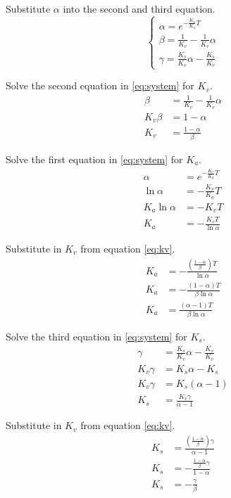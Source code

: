 \documentclass[10pt,conference,compsoc]{IEEEtran}
\begin{document}
Substitute $\alpha$ into the second and third equation.
\begin{equation}
  \begin{cases}
    \alpha = e^{-\frac{K_v}{K_a} T} \\
    \beta = \frac{1}{K_v} - \frac{1}{K_v}\alpha \\
    \gamma = \frac{K_s}{K_v}\alpha - \frac{K_s}{K_v}
  \end{cases} \label{eq:system}
\end{equation}

Solve the second equation in \eqref{eq:system} for $K_v$.
\begin{align}
  \beta &= \frac{1}{K_v} - \frac{1}{K_v}\alpha \nonumber \\
  K_v \beta &= 1 - \alpha \nonumber \\
  K_v &= \frac{1 - \alpha}{\beta} \label{eq:kv}
\end{align}

Solve the first equation in \eqref{eq:system} for $K_a$.
\begin{align*}
  \alpha &= e^{-\frac{K_v}{K_a} T} \\
  \ln\alpha &= -\frac{K_v}{K_a} T \\
  K_a \ln\alpha &= -K_v T \\
  K_a &= -\frac{K_v T}{\ln\alpha}
\end{align*}

Substitute in $K_v$ from equation \eqref{eq:kv}.
\begin{align}
  K_a &= -\frac{\left(\frac{1 - \alpha}{\beta}\right) T}{\ln\alpha} \nonumber \\
  K_a &= -\frac{(1 - \alpha) T}{\beta \ln\alpha} \nonumber \\
  K_a &= \frac{(\alpha - 1) T}{\beta \ln\alpha}
\end{align}

Solve the third equation in \eqref{eq:system} for $K_s$.
\begin{align*}
  \gamma &= \frac{K_s}{K_v} \alpha - \frac{K_s}{K_v} \\
  K_v \gamma &= K_s \alpha - K_s \\
  K_v \gamma &= K_s(\alpha - 1) \\
  K_s &= \frac{K_v \gamma}{\alpha - 1}
\end{align*}

Substitute in $K_v$ from equation \eqref{eq:kv}.
\begin{align}
  K_s &= \frac{\left(\frac{1 - \alpha}{\beta}\right) \gamma}{\alpha - 1}
    \nonumber \\
  K_s &= -\frac{\frac{1 - \alpha}{\beta} \gamma}{1 - \alpha}
    \nonumber \\
  K_s &= -\frac{\gamma}{\beta}
\end{align}
\end{document}
